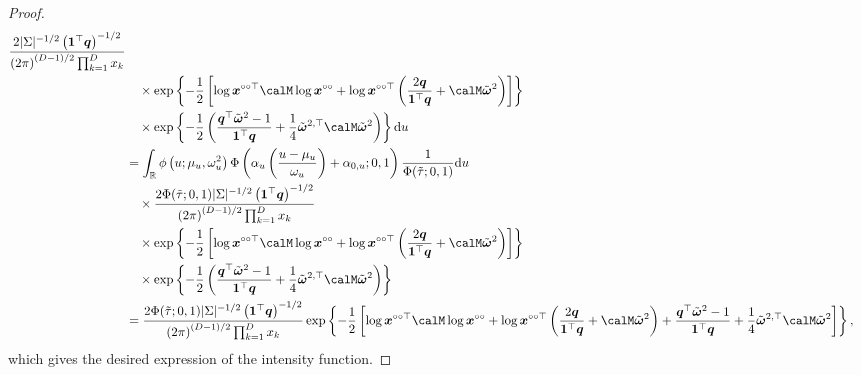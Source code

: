 \documentclass[12pt]{article}
\begin{document}
\begin{proof}
\begin{align*}
\frac{2| \Sigma |^{-1/2} \left( \bm 1^\top \bm q\right)^{-1/2}}{\left( 2\pi \right)^{(D-1)/2}\prod_{k=1}^Dx_k} \\
&\quad \times \exp \left\{ -\frac{1}{2} \left[ \log \bm x^{\circ\circ\top} \calM \log \bm x^{\circ\circ} + \log \bm x^{\circ\circ\top} \left( \frac{2 \bm q}{\bm 1^\top \bm q} + \calM\tilde{\bm\omega}^2\right) \right]\right\} \\
& \quad \times \exp \left\{- \frac{1}{2} \left( \frac{\bm q^\top\tilde{\bm \omega}^2 - 1}{\bm 1 ^\top \bm q} + \frac{1}{4}\tilde{\bm\omega}^{2,\top}\calM\tilde{\bm\omega}^2\right) \right\} \text du   \\
&=  \int_{\mathbb R} \phi \left( u; \mu_u, \omega_u^2 \right) \Phi\left( \alpha_u\left(\frac{u-\mu_u}{\omega_u}\right) + \alpha_{0,u};0,1\right)\frac{1}{\Phi(\tilde{\tau};0,1)} \text du \\
&\quad\times \frac{2\Phi(\tilde{\tau};0,1)| \Sigma |^{-1/2} \left( \bm 1^\top \bm q\right)^{-1/2}}{\left( 2\pi \right)^{(D-1)/2}\prod_{k=1}^Dx_k} \\
&\quad \times \exp \left\{ -\frac{1}{2} \left[ \log \bm x^{\circ\circ\top} \calM \log \bm x^{\circ\circ} + \log \bm x^{\circ\circ\top} \left( \frac{2 \bm q}{\bm 1^\top \bm q} + \calM\tilde{\bm\omega}^2\right) \right]\right\} \\
& \quad \times \exp \left\{- \frac{1}{2} \left( \frac{\bm q^\top\tilde{\bm \omega}^2 - 1}{\bm 1 ^\top \bm q} + \frac{1}{4}\tilde{\bm\omega}^{2,\top}\calM\tilde{\bm\omega}^2\right) \right\} \\
&=\frac{2\Phi(\tilde{\tau};0,1)| \Sigma |^{-1/2} \left( \bm 1^\top \bm q\right)^{-1/2}}{\left( 2\pi \right)^{(D-1)/2}\prod_{k=1}^Dx_k}\exp \left\{ -\frac{1}{2} \left[ \log \bm x^{\circ\circ\top} \calM \log \bm x^{\circ\circ} + \log \bm x^{\circ\circ\top} \left( \frac{2 \bm q}{\bm 1^\top \bm q}+\calM\tilde{\bm\omega}^2\right) + \frac{\bm q^\top\tilde{\bm \omega}^2 - 1}{\bm 1 ^\top \bm q } + \frac{1}{4}\tilde{\bm\omega}^{2,\top}\calM\tilde{\bm\omega}^2 \right]\right\},
\end{align*}
which gives the desired expression of the intensity function. 
% 
\end{proof}

\end{document}
